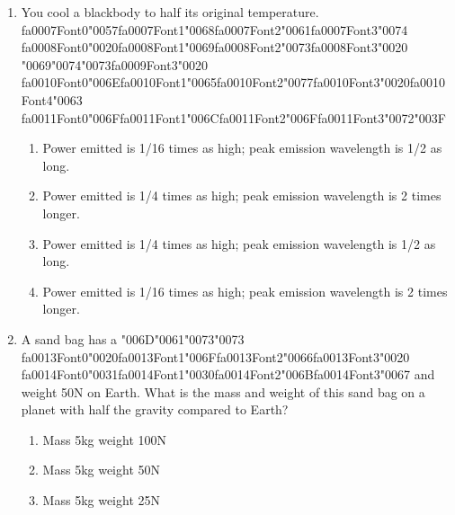 \documentclass[12pt]{article}
\begin{document}
\begin{enumerate}[label=\arabic*.]
\begin{enumerate}[label=(\alph*)]
    \item Gaps in Saturn's rings.
    \item Breaking of small Jovian moons to form ring materials.
\end{enumerate}
\item You cool a blackbody to half its original temperature. {\csname fa0007Font0\endcsname\char"0057}{\csname fa0007Font1\endcsname\char"0068}{\csname fa0007Font2\endcsname\char"0061}{\csname fa0007Font3\endcsname\char"0074} {\csname fa0008Font0\endcsname\char"0020}{\csname fa0008Font1\endcsname\char"0069}{\csname fa0008Font2\endcsname\char"0073}{\csname fa0008Font3\endcsname\char"0020} {\char"0069}{\char"0074}{\char"0073}{\csname fa0009Font3\endcsname\char"0020} {\csname fa0010Font0\endcsname\char"006E}{\csname fa0010Font1\endcsname\char"0065}{\csname fa0010Font2\endcsname\char"0077}{\csname fa0010Font3\endcsname\char"0020}{\csname fa0010Font4\endcsname\char"0063} {\csname fa0011Font0\endcsname\char"006F}{\csname fa0011Font1\endcsname\char"006C}{\csname fa0011Font2\endcsname\char"006F}{\csname fa0011Font3\endcsname\char"0072}{\char"003F}
\begin{enumerate}[label=(\alph*)]
    \item Power emitted is 1/16 times as high; peak emission wavelength is 1/2 as long.
    \item Power emitted is 1/4 times as high; peak emission wavelength is 2 times longer.
    \item Power emitted is 1/4 times as high; peak emission wavelength is 1/2 as long.
    \item Power emitted is 1/16 times as high; peak emission wavelength is 2 times longer.
\end{enumerate}
\item A sand bag has a {\char"006D}{\char"0061}{\char"0073}{\char"0073} {\csname fa0013Font0\endcsname\char"0020}{\csname fa0013Font1\endcsname\char"006F}{\csname fa0013Font2\endcsname\char"0066}{\csname fa0013Font3\endcsname\char"0020} {\csname fa0014Font0\endcsname\char"0031}{\csname fa0014Font1\endcsname\char"0030}{\csname fa0014Font2\endcsname\char"006B}{\csname fa0014Font3\endcsname\char"0067} and weight 50N on Earth. What is the mass and weight of this
sand bag on a planet with half the gravity compared to Earth?
\begin{enumerate}[label=(\alph*)]
    \item Mass 5kg weight 100N
    \item Mass 5kg weight 50N
    \item Mass 5kg weight 25N

\end{enumerate}
\end{enumerate}
\end{document}
